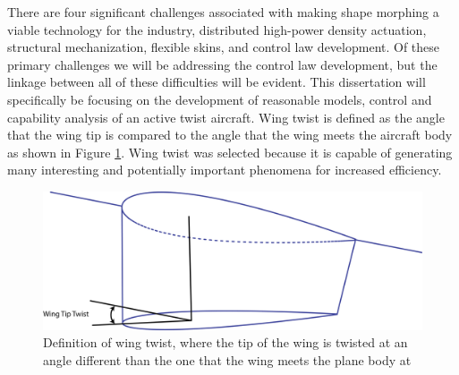 \documentclass[11pt]{ucthesis}
\begin{document}
There are four significant challenges associated with making shape morphing a viable technology for the industry, distributed high-power density actuation, structural mechanization, flexible skins, and control law development. \cite{reich2007introduction} Of these primary challenges we will be addressing the control law development, but the linkage between all of these difficulties will be evident. This dissertation will specifically be focusing on the development of reasonable models, control and capability analysis of an active twist aircraft. Wing twist is defined as the angle that the wing tip is compared to the angle that the wing meets the aircraft body as shown in Figure \ref{fig:twist}. Wing twist was selected because it is capable of generating many interesting and potentially important phenomena for increased efficiency.

\begin{figure}[thpb]
\centering
\includegraphics[width=0.75\linewidth]{./Figures/WingTipTwist.png}
\caption{Definition of wing twist, where the tip of the wing is twisted at an angle different than the one that the wing meets the plane body at}
\label{fig:twist}
\end{figure}
\end{document}

